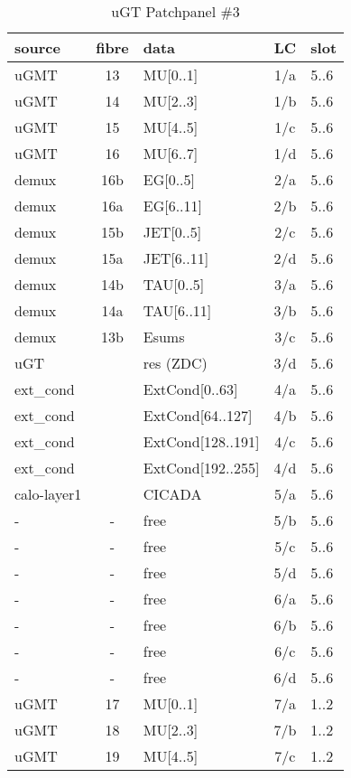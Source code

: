 \begin{longtable}{|l|c|l|c|l|}
\caption{uGT Patchpanel \#3}
    \label{tab:app:ugt_opt_pp_2}\\
\hline
\textbf{source}& \textbf{fibre}& \textbf{data}& \textbf{LC}& \textbf{slot}\\
\hline
\hline
\endhead
uGMT  & 13  & MU[0..1]   & 1/a  & 5..6 \\\hline
uGMT  & 14  & MU[2..3]   & 1/b  & 5..6 \\\hline
uGMT  & 15  & MU[4..5]   & 1/c  & 5..6 \\\hline
uGMT  & 16  & MU[6..7]   & 1/d  & 5..6 \\\hline
demux & 16b & EG[0..5]   & 2/a  & 5..6 \\\hline
demux & 16a & EG[6..11]  & 2/b  & 5..6 \\\hline
demux & 15b & JET[0..5]  & 2/c  & 5..6 \\\hline
demux & 15a & JET[6..11] & 2/d  & 5..6 \\\hline
demux & 14b & TAU[0..5]  & 3/a  & 5..6 \\\hline
demux & 14a & TAU[6..11] & 3/b  & 5..6 \\\hline
demux & 13b & Esums      & 3/c  & 5..6 \\\hline
uGT   &     & res (ZDC)  & 3/d  & 5..6 \\\hline
ext\_cond &     & ExtCond[0..63]    & 4/a  & 5..6 \\\hline
ext\_cond &     & ExtCond[64..127]  & 4/b  & 5..6 \\\hline
ext\_cond &     & ExtCond[128..191] & 4/c  & 5..6 \\\hline
ext\_cond &     & ExtCond[192..255] & 4/d  & 5..6 \\\hline
calo-layer1 &   & CICADA & 5/a  & 5..6 \\\hline
- & - & free & 5/b  & 5..6 \\\hline
- & - & free & 5/c  & 5..6 \\\hline
- & - & free & 5/d  & 5..6 \\\hline
- & - & free & 6/a  & 5..6 \\\hline
- & - & free & 6/b  & 5..6 \\\hline
- & - & free & 6/c  & 5..6 \\\hline
- & - & free & 6/d  & 5..6 \\\hline
\hline
uGMT  & 17  & MU[0..1]   & 7/a  & 1..2 \\\hline
uGMT  & 18  & MU[2..3]   & 7/b  & 1..2 \\\hline
uGMT  & 19  & MU[4..5]   & 7/c  & 1..2 \\\hline

\end{longtable}
